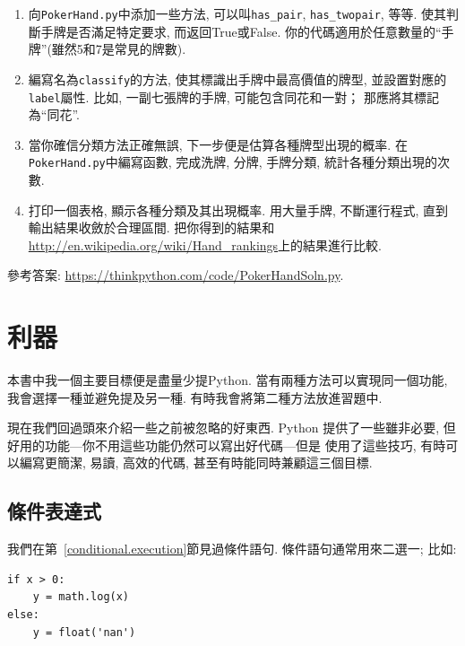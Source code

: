 \documentclass[10pt]{book}
\begin{document}
\begin{exercise}
\begin{enumerate}
\item 向{\tt PokerHand.py}中添加一些方法, 可以叫\verb"has_pair",
\verb"has_twopair", 等等. 使其判斷手牌是否滿足特定要求, 而返回True或False. 
你的代碼適用於任意數量的``手牌''(雖然5和7是常見的牌數). 

\item 編寫名為{\tt classify}的方法, 使其標識出手牌中最高價值的牌型, 
並設置對應的{\tt label}屬性. 比如, 一副七張牌的手牌, 
可能包含同花和一對；
那應將其標記為``同花''.

\item 當你確信分類方法正確無誤, 下一步便是估算各種牌型出現的概率. 
在{\tt PokerHand.py}中編寫函數, 完成洗牌, 分牌, 手牌分類, 
統計各種分類出現的次數. 

\item 打印一個表格, 顯示各種分類及其出現概率. 
用大量手牌, 不斷運行程式, 直到輸出結果收斂於合理區間. 
把你得到的結果和\url{http://en.wikipedia.org/wiki/Hand_rankings}上的結果進行比較. 

\end{enumerate}

參考答案: \url{https://thinkpython.com/code/PokerHandSoln.py}.
\end{exercise}


\chapter{利器}

本書中我一個主要目標便是盡量少提Python. 
當有兩種方法可以實現同一個功能, 我會選擇一種並避免提及另一種. 
有時我會將第二種方法放進習題中. 

現在我們回過頭來介紹一些之前被忽略的好東西. 
Python 提供了一些雖非必要, 但好用的功能---你不用這些功能仍然可以寫出好代碼---但是
使用了這些技巧, 有時可以編寫更簡潔, 易讀, 高效的代碼, 甚至有時能同時兼顧這三個目標. 


\section{條件表達式}

我們在第~\ref{conditional.execution}節見過條件語句. 
條件語句通常用來二選一; 比如:

\begin{verbatim}
if x > 0:
    y = math.log(x)
else:
    y = float('nan')
\end{verbatim}
\end{document}
